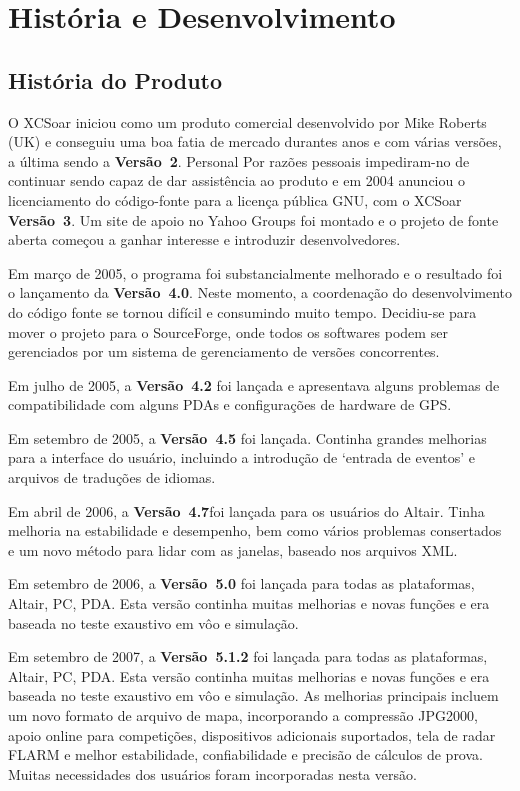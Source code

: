 \chapter{História e Desenvolvimento}\label{cha:history-development}


\section{História do Produto}

O XCSoar iniciou como um produto comercial desenvolvido por Mike Roberts (UK) e conseguiu uma boa fatia de mercado durantes anos e com várias versões, a última sendo a {\bf Versão~2}.
Personal Por razões pessoais impediram-no de continuar sendo capaz de dar assistência ao produto e em 2004 anunciou o licenciamento do código-fonte para a licença pública GNU, com o XCSoar {\bf Versão~3}.  Um site de apoio no Yahoo Groups foi montado e o projeto de fonte aberta começou a ganhar interesse e introduzir desenvolvedores.

Em março de 2005, o programa foi substancialmente melhorado e o resultado foi o lançamento da {\bf Versão~4.0}.  Neste momento, a coordenação do desenvolvimento do código fonte se tornou difícil e consumindo muito tempo.  Decidiu-se para mover o projeto para o SourceForge, onde todos os softwares podem ser gerenciados por um sistema de gerenciamento de versões concorrentes.

Em julho de 2005, a {\bf Versão~4.2} foi lançada e apresentava alguns problemas de compatibilidade com alguns PDAs e configurações de hardware de GPS.

Em setembro de 2005, a {\bf Versão~4.5} foi lançada.  Continha grandes melhorias para a interface do usuário, incluindo a introdução de ‘entrada de eventos’ e arquivos de traduções de idiomas.

Em abril de 2006, a {\bf Versão~4.7}foi lançada para os usuários do Altair.  Tinha melhoria na estabilidade e desempenho, bem como vários problemas consertados e um novo método para lidar com as janelas, baseado nos arquivos XML.

Em setembro de 2006, a {\bf Versão~5.0} foi lançada para todas as plataformas, Altair, PC, PDA.  Esta versão continha muitas melhorias e novas funções e era baseada no teste exaustivo em vôo e simulação.

Em setembro de 2007, a {\bf Versão~5.1.2} foi lançada para todas as plataformas, Altair, PC, PDA.  Esta versão continha muitas melhorias e novas funções e era baseada no teste exaustivo em vôo e simulação.  As melhorias principais incluem um novo formato de arquivo de mapa, incorporando a compressão JPG2000, apoio online para competições, dispositivos adicionais suportados, tela de radar FLARM e melhor estabilidade, confiabilidade e precisão de cálculos de prova.  Muitas necessidades dos usuários foram incorporadas nesta versão.

